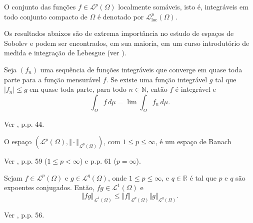 \documentclass[a4paper, 11pt]{book}
\theoremstyle{definition}
\newcommand{\bN}{\mathbb{N}}
\newcommand{\bR}{\mathbb{R}}
\newcommand{\cL}{\mathcal{L}}
\begin{document}
\begin{dbox}
    O conjunto das funções $f \in \cL^p(\Omega)$ localmente somáveis, isto é, integráveis em todo conjunto compacto de $\Omega$ é denotado por $\cL^p_{\mathrm{loc}}(\Omega)$.
\end{dbox}

Os resultados abaixos são de extrema importância no estudo de espaços de Sobolev e podem ser encontrados, em sua maioria, em um curso introdutório de medida e integração de Lebesgue (ver \cite{axler-measure.theory,bartle-measure.theory,folland-real.analysis}).

\begin{tbox} \label{thm:teorema-da-convergencia-dominada}
    Seja $(f_n)$ uma sequência de funções integráveis que converge em quase toda parte para a função mensurável $f$.
    Se existe uma função integrável $g$ tal que $|f_n| \leqslant g$ em quase toda parte, para todo $n \in \bN$, então $f$ é integrável e
    \[
        \int_\Omega f \,d\mu = \lim \int_\Omega f_n \,d\mu.
    \]
\end{tbox}
\begin{prf}
    Ver \cite{bartle-measure.theory}, p.p. 44.
\end{prf}

\begin{tbox} \label{thm:lp-completo-pre}
    O espaço $(\cL^p(\Omega), \Vert \cdot \Vert_{\cL^p(\Omega)})$, com $1 \leqslant p \leqslant \infty$, é um espaço de Banach\footnotemark
\end{tbox}
\begin{prf}
    Ver \cite{bartle-measure.theory}, p.p. 59 ($1 \leqslant p < \infty$) e p.p. 61 ($p = \infty$).
\end{prf}


\begin{tbox} \label{thm:pre-desigualdade-de-holder}
    Sejam $f \in \cL^p(\Omega)$ e $g \in \cL^q(\Omega)$, onde $1 \leqslant p \leqslant \infty$, e $q \in \bR$ é tal que $p$ e $q$ são expoentes conjugados\footnotemark.
    Então, $fg \in \cL^1(\Omega)$ e
    \[
        \Vert fg \Vert_{\cL^1(\Omega)} \leqslant \Vert f \Vert_{\cL^p(\Omega)} \Vert g \Vert_{\cL^q(\Omega)}.
    \]
\end{tbox}
\begin{prf}
    Ver \cite{bartle-measure.theory}, p.p. 56.
\end{prf}
\end{document}

